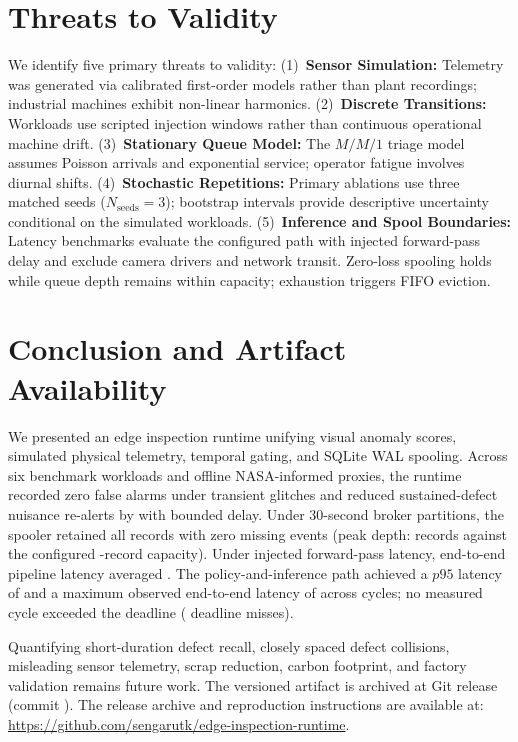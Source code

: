 \documentclass[conference]{IEEEtran}
\begin{document}
\section{Threats to Validity}
We identify five primary threats to validity:
(1)~\textbf{Sensor Simulation:} Telemetry was generated via calibrated first-order models rather than plant recordings; industrial machines exhibit non-linear harmonics.
(2)~\textbf{Discrete Transitions:} Workloads use scripted injection windows rather than continuous operational machine drift.
(3)~\textbf{Stationary Queue Model:} The $M/M/1$ triage model assumes Poisson arrivals and exponential service; operator fatigue involves diurnal shifts.
(4)~\textbf{Stochastic Repetitions:} Primary ablations use three matched seeds ($N_{\mathrm{seeds}} = 3$); bootstrap intervals provide descriptive uncertainty conditional on the simulated workloads.
(5)~\textbf{Inference and Spool Boundaries:} Latency benchmarks evaluate the configured path with injected forward-pass delay and exclude camera drivers and network transit. Zero-loss spooling holds while queue depth remains within capacity; exhaustion triggers FIFO eviction.

\section{Conclusion and Artifact Availability}
We presented an edge inspection runtime unifying visual anomaly scores, simulated physical telemetry, temporal gating, and SQLite WAL spooling. Across six benchmark workloads and offline NASA-informed proxies, the runtime recorded zero false alarms under transient glitches and reduced sustained-defect nuisance re-alerts by \SustainedSuppressionFull{} with bounded delay. Under 30-second broker partitions, the spooler retained all \SpoolStressGeneratedEvents{} records with zero missing events (peak depth: \SpoolStressPeakQueueDepth{} records against the configured \SpoolBufferCapacity{}-record capacity). Under injected forward-pass latency, end-to-end pipeline latency averaged \MeanPipelineLatency{}. The policy-and-inference path achieved a $p95$ latency of \CorePNinetyFiveLatency{} and a maximum observed end-to-end latency of \MaxPipelineLatency{} across \LatencyCycleCount{} cycles; no measured cycle exceeded the \TargetDeadlineMs{} deadline (\DeadlineMissRate{} deadline misses).

Quantifying short-duration defect recall, closely spaced defect collisions, misleading sensor telemetry, scrap reduction, carbon footprint, and factory validation remains future work. The versioned artifact is archived at Git release \texttt{\ArtifactReleaseTag{}} (commit \texttt{\GitCommitHash{}}). The release archive and reproduction instructions are available at: \url{https://github.com/sengarutk/edge-inspection-runtime}.



\end{document}
